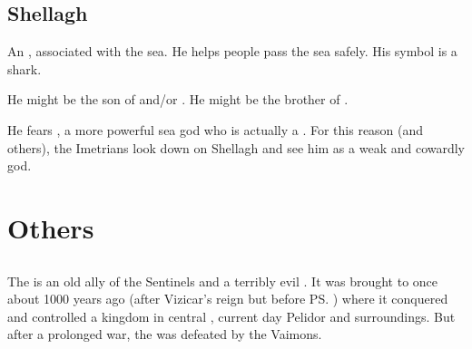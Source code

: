 \section{Shellagh}
An , associated with the sea. 
He helps people pass the sea safely. 
His symbol is a shark. 

He might be the son of  and/or .
He might be the brother of . 

He fears , a more powerful sea god who is actually a \nagalord. 
For this reason (and others), the Imetrians look down on Shellagh and see him as a weak and cowardly god. 





























\chapter{Others}















\section{\Haskelek}
The \Haskelek{} is an old ally of the Sentinels and a terribly evil \daemon. 
It was brought to \Miith{} once about 1000 years ago (after Vizicar's reign but before \ps{\Belzir}) where it conquered and controlled a kingdom in central \Velcad{}, current day Pelidor and surroundings. 
But after a prolonged war, the \Haskelek{} was defeated by the Vaimons. 


